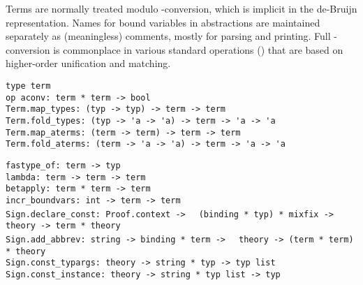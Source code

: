 \begin{isabellebody}
\begin{isamarkuptext}
  Terms are normally treated modulo -conversion, which is
  implicit in the de-Bruijn representation.  Names for bound variables
  in abstractions are maintained separately as (meaningless) comments,
  mostly for parsing and printing.  Full -conversion is
  commonplace in various standard operations ()
  that are based on higher-order unification and matching.%
\end{isamarkuptext}%
\isamarkuptrue%
%
\isadelimmlref
%
\endisadelimmlref
%
\isatagmlref
%
\begin{isamarkuptext}%
\begin{mldecls}
  \verb|type term| \\
  \verb|op aconv: term * term -> bool| \\
  \verb|Term.map_types: (typ -> typ) -> term -> term| \\
  \verb|Term.fold_types: (typ -> 'a -> 'a) -> term -> 'a -> 'a| \\
  \verb|Term.map_aterms: (term -> term) -> term -> term| \\
  \verb|Term.fold_aterms: (term -> 'a -> 'a) -> term -> 'a -> 'a| \\
  \end{mldecls}
  \begin{mldecls}
  \verb|fastype_of: term -> typ| \\
  \verb|lambda: term -> term -> term| \\
  \verb|betapply: term * term -> term| \\
  \verb|incr_boundvars: int -> term -> term| \\
  \verb|Sign.declare_const: Proof.context ->|\isasep\isanewline%
\verb|  (binding * typ) * mixfix -> theory -> term * theory| \\
  \verb|Sign.add_abbrev: string -> binding * term ->|\isasep\isanewline%
\verb|  theory -> (term * term) * theory| \\
  \verb|Sign.const_typargs: theory -> string * typ -> typ list| \\
  \verb|Sign.const_instance: theory -> string * typ list -> typ| \\
  \end{mldecls}


\end{isamarkuptext}
\end{isabellebody}

